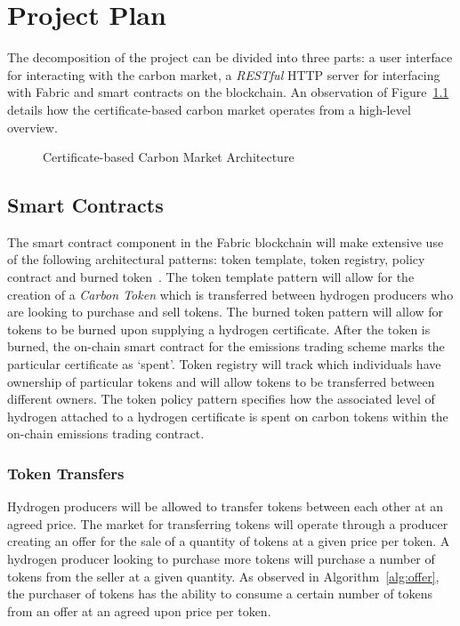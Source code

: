 \chapter{Project Plan}\label{ch:plan}
The decomposition of the project can be
divided into three parts:
a user interface for interacting with the
carbon market, a \textit{RESTful} HTTP server for
interfacing with Fabric and smart contracts on the
blockchain. An observation of Figure~\ref{fig:arch} details
how the certificate-based carbon market operates from a
high-level overview.

\begin{figure}[ht]
    \centering
    \begin{adjustbox}{max totalsize={2.1\textwidth}{1\textheight},center}
        
    \end{adjustbox}
    \caption{Certificate-based Carbon Market Architecture}
    \label{fig:arch}
\end{figure}

\section{Smart Contracts}
The smart contract component in the Fabric blockchain will
make extensive use of the following architectural
patterns: token template, token registry, policy contract
and burned token~\cite{patterns}. The token template pattern
will allow for the creation of a \textit{Carbon Token} which
is transferred between hydrogen producers who are looking
to purchase and sell tokens. The burned token pattern will
allow for tokens to be burned upon supplying a hydrogen
certificate. After the token is burned, the on-chain
smart contract for the emissions trading scheme marks
the particular certificate as `spent'. Token
registry will track which individuals have ownership of
particular tokens and will allow tokens to be transferred
between different owners. The token policy pattern
specifies how the associated level of hydrogen attached to
a hydrogen certificate is spent on carbon tokens within
the on-chain emissions trading contract.

\subsection{Token Transfers}
Hydrogen producers will be allowed to transfer tokens
between each other at an agreed price. The market
for transferring tokens will operate through a producer
creating an offer for the sale of a quantity of tokens
at a given price per token. A hydrogen producer looking
to purchase more tokens will purchase a number of tokens from
the seller at a given quantity. As observed in
Algorithm~\ref{alg:offer}, the purchaser of tokens
has the ability to consume a certain number of tokens from
an offer at an agreed upon price per token.


